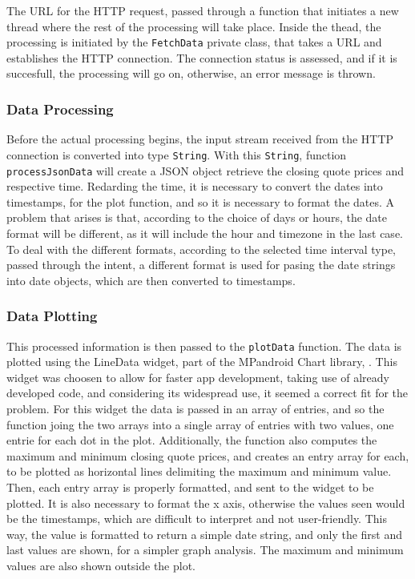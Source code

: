 \documentclass{article}
\begin{document}
The URL for the HTTP request, passed through a function that initiates a new thread where the rest of the processing will take place.
Inside the thead, the processing is initiated by the \texttt{FetchData} private class, that takes a URL and establishes the HTTP connection.
The connection status is assessed, and if it is succesfull, the processing will go on, otherwise, an error message is thrown.

\subsubsection{Data Processing}
Before the actual processing begins, the input stream received from the HTTP connection is converted into type \texttt{String}.
With this \texttt{String}, function \texttt{processJsonData} will create a JSON object retrieve the closing quote prices and respective time.
Redarding the time, it is necessary to convert the dates into timestamps, for the plot function, and so it is necessary to format the dates.
A problem that arises is that, according to the choice of days or hours, the date format will be different, as it will include the hour and timezone in the last case.
To deal with the different formats, according to the selected time interval type, passed through the intent, a different format is used for pasing the date strings into date objects, which are then converted to timestamps.

\subsubsection{Data Plotting}
This processed information is then passed to the \texttt{plotData} function.
The data is plotted using the LineData widget, part of the MPandroid Chart library, \cite{MPAndroidChart}.
This widget was choosen to allow for faster app development, taking use of already developed code, and considering its widespread use, it seemed a correct fit for the problem.
For this widget the data is passed in an array of entries, and so the function joing the two arrays into a single array of entries with two values, one entrie for each dot in the plot.
Additionally, the function also computes the maximum and minimum closing quote prices, and creates an entry array for each, to be plotted as horizontal lines delimiting the maximum and minimum value.
Then, each entry array is properly formatted, and sent to the widget to be plotted.
It is also necessary to format the x axis, otherwise the values seen would be the timestamps, which are difficult to interpret and not user-friendly.
This way, the value is formatted to return a simple date string, and only the first and last values are shown, for a simpler graph analysis.
The maximum and minimum values are also shown outside the plot.
\end{document}

